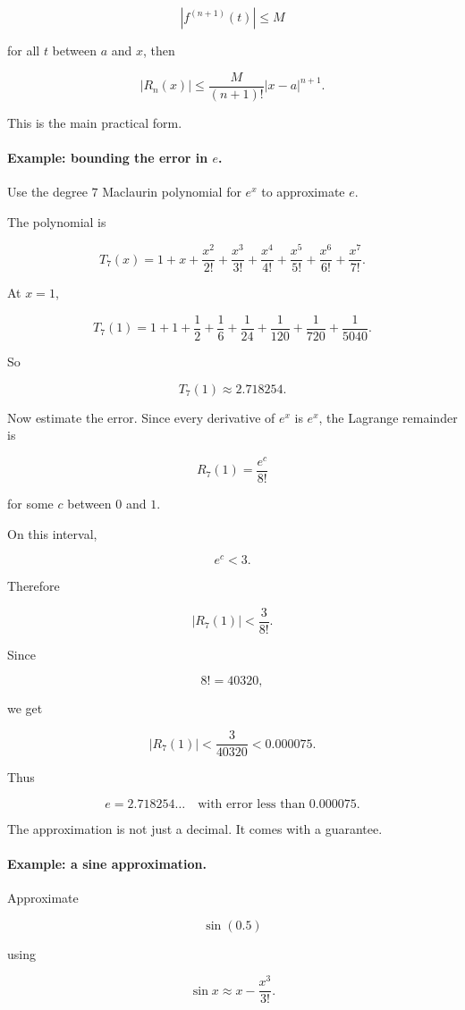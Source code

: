 \[
|f^{(n+1)}(t)|\le M
\]

for all \(t\) between \(a\) and \(x\), then

\[
\boxed{
|R_n(x)|
\le
\frac{M}{(n+1)!}|x-a|^{n+1}.
}
\]

This is the main practical form.

\paragraph{Example: bounding the error in \(e\).}
Use the degree \(7\) Maclaurin polynomial for \(e^x\) to approximate \(e\).

The polynomial is

\[
T_7(x)
=
1+x+\frac{x^2}{2!}+\frac{x^3}{3!}
+\frac{x^4}{4!}+\frac{x^5}{5!}
+\frac{x^6}{6!}+\frac{x^7}{7!}.
\]

At \(x=1\),

\[
T_7(1)=
1+1+\frac12+\frac16+\frac1{24}+\frac1{120}+\frac1{720}+\frac1{5040}.
\]

So

\[
T_7(1)\approx 2.718254.
\]

Now estimate the error.  Since every derivative of \(e^x\) is \(e^x\), the Lagrange
remainder is

\[
R_7(1)=\frac{e^c}{8!}
\]

for some \(c\) between \(0\) and \(1\).

On this interval,

\[
e^c<3.
\]

Therefore

\[
|R_7(1)|<\frac3{8!}.
\]

Since

\[
8!=40320,
\]

we get

\[
|R_7(1)|<\frac3{40320}<0.000075.
\]

Thus

\[
\boxed{
e=2.718254\ldots \quad \text{with error less than }0.000075.
}
\]

The approximation is not just a decimal.  It comes with a guarantee.

\paragraph{Example: a sine approximation.}
Approximate

\[
\sin(0.5)
\]

using

\[
\sin x\approx x-\frac{x^3}{3!}.
\]


